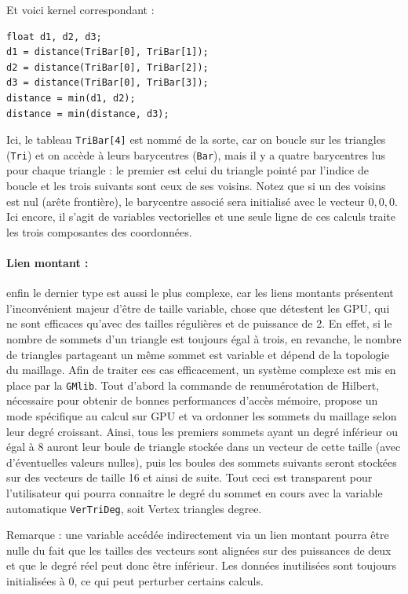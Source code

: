 \documentclass[a4paper,12pt]{article}
\begin{document}
Et voici kernel correspondant :

\begin{tt}
\begin{verbatim}
float d1, d2, d3;
d1 = distance(TriBar[0], TriBar[1]);
d2 = distance(TriBar[0], TriBar[2]);
d3 = distance(TriBar[0], TriBar[3]);
distance = min(d1, d2);
distance = min(distance, d3);
\end{verbatim}
\end{tt}
\normalfont

Ici, le tableau {\tt TriBar[4]} est nommé de la sorte, car on boucle sur les triangles ({\tt Tri}) et on accède à leurs barycentres ({\tt Bar}), mais il y a quatre barycentres lus pour chaque triangle : le premier est celui du triangle pointé par l'indice de boucle et les trois suivants sont ceux de ses voisins.
Notez que si un des voisins est nul (arête frontière), le barycentre associé sera initialisé avec le vecteur ${0,0,0}$.
Ici encore, il s'agit de variables vectorielles et une seule ligne de ces calculs traite les trois composantes des coordonnées.

\paragraph{Lien montant :} enfin le dernier type est aussi le plus complexe, car les liens montants présentent l'inconvénient majeur d'être de taille variable, chose que détestent les GPU, qui ne sont efficaces qu'avec des tailles régulières et de puissance de 2.
En effet, si le nombre de sommets d'un triangle est toujours égal à trois, en revanche, le nombre de triangles partageant un même sommet est variable et dépend de la topologie du maillage.
Afin de traiter ces cas efficacement, un système complexe est mis en place par la {\tt GMlib}.
Tout d'abord la commande de renumérotation de Hilbert, nécessaire pour obtenir de bonnes performances d'accès mémoire, propose un mode spécifique au calcul sur GPU et va ordonner les sommets du maillage selon leur degré croissant.
Ainsi, tous les premiers sommets ayant un degré inférieur ou égal à 8 auront leur boule de triangle stockée dans un vecteur de cette taille (avec d'éventuelles valeurs nulles), puis les boules des sommets suivants seront stockées sur des vecteurs de taille 16 et ainsi de suite.
Tout ceci est transparent pour l'utilisateur qui pourra connaitre le degré du sommet en cours avec la variable automatique {\tt VerTriDeg}, soit Vertex triangles degree.

Remarque : une variable accédée indirectement via un lien montant pourra être nulle du fait que les tailles des vecteurs sont alignées sur des puissances de deux et que le degré réel peut donc être inférieur. Les données inutilisées sont toujours initialisées à 0, ce qui peut perturber certains calculs.
\end{document}
